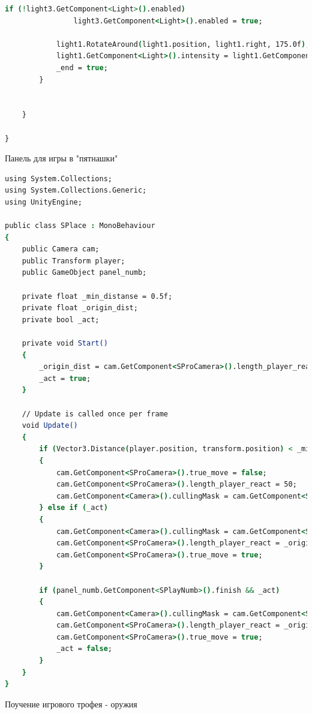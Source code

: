 \begin{lstlisting}[language=csh]
            if (!light3.GetComponent<Light>().enabled)
                light3.GetComponent<Light>().enabled = true;

            light1.RotateAround(light1.position, light1.right, 175.0f);
            light1.GetComponent<Light>().intensity = light1.GetComponent<Light>().intensity / 1.4f;
            _end = true;
        }
        

    }

}
\end{lstlisting}

 Панель для игры в "пятнашки"

\begin{lstlisting}[language=csh]
using System.Collections;
using System.Collections.Generic;
using UnityEngine;

public class SPlace : MonoBehaviour
{
    public Camera cam;
    public Transform player;
    public GameObject panel_numb;

    private float _min_distanse = 0.5f;
    private float _origin_dist;
    private bool _act;

    private void Start()
    {
        _origin_dist = cam.GetComponent<SProCamera>().length_player_react;
        _act = true;
    }

    // Update is called once per frame
    void Update()
    {
        if (Vector3.Distance(player.position, transform.position) < _min_distanse && panel_numb.GetComponent<SPlayNumb>().active && _act)
        {
            cam.GetComponent<SProCamera>().true_move = false;
            cam.GetComponent<SProCamera>().length_player_react = 50;
            cam.GetComponent<Camera>().cullingMask = cam.GetComponent<SProCamera>().no_player;
        } else if (_act)
        {
            cam.GetComponent<Camera>().cullingMask = cam.GetComponent<SProCamera>()._origin_mask;
            cam.GetComponent<SProCamera>().length_player_react = _origin_dist;
            cam.GetComponent<SProCamera>().true_move = true;
        }

        if (panel_numb.GetComponent<SPlayNumb>().finish && _act)
        {
            cam.GetComponent<Camera>().cullingMask = cam.GetComponent<SProCamera>()._origin_mask;
            cam.GetComponent<SProCamera>().length_player_react = _origin_dist;
            cam.GetComponent<SProCamera>().true_move = true;
            _act = false;
        }
    }
}
\end{lstlisting}

 Поучение игрового трофея - оружия

